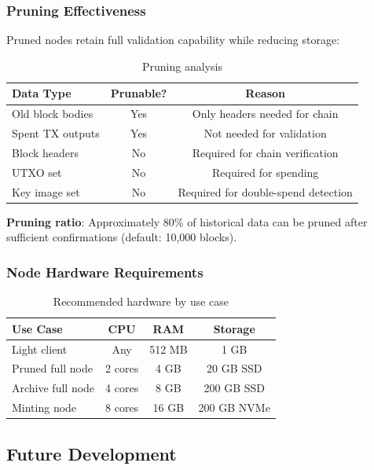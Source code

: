 \subsubsection{Pruning Effectiveness}

Pruned nodes retain full validation capability while reducing storage:

\begin{table}[h]
\centering
\caption{Pruning analysis}
\label{tab:pruning}
\begin{tabular}{@{}lcc@{}}
\toprule
\textbf{Data Type} & \textbf{Prunable?} & \textbf{Reason} \\
\midrule
Old block bodies & Yes & Only headers needed for chain \\
Spent TX outputs & Yes & Not needed for validation \\
Block headers & No & Required for chain verification \\
UTXO set & No & Required for spending \\
Key image set & No & Required for double-spend detection \\
\bottomrule
\end{tabular}
\end{table}

\textbf{Pruning ratio}: Approximately 80\% of historical data can be pruned
after sufficient confirmations (default: 10,000 blocks).

\subsubsection{Node Hardware Requirements}

\begin{table}[h]
\centering
\caption{Recommended hardware by use case}
\label{tab:hardware}
\begin{tabular}{@{}lccc@{}}
\toprule
\textbf{Use Case} & \textbf{CPU} & \textbf{RAM} & \textbf{Storage} \\
\midrule
Light client & Any & 512 MB & 1 GB \\
Pruned full node & 2 cores & 4 GB & 20 GB SSD \\
Archive full node & 4 cores & 8 GB & 200 GB SSD \\
Minting node & 8 cores & 16 GB & 200 GB NVMe \\
\bottomrule
\end{tabular}
\end{table}

\subsection{Future Development}

